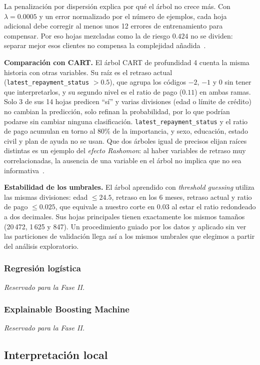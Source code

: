 \documentclass[a4paper,11pt]{article}
\begin{document}
La penalización por dispersión explica por qué el árbol no crece más. Con $\lambda=0.0005$ y un error normalizado por el número de ejemplos, cada hoja adicional debe corregir al menos unos 12 errores de entrenamiento para compensar. Por eso hojas mezcladas como la de riesgo $0.424$ no se dividen: separar mejor esos clientes no compensa la complejidad añadida~\cite{slidesLogical}.

\textbf{Comparación con CART.} El árbol CART de profundidad 4 cuenta la misma historia con otras variables. Su raíz es el retraso actual (\texttt{latest\_repayment\_status} $> 0.5$), que agrupa los códigos $-2$, $-1$ y $0$ sin tener que interpretarlos, y su segundo nivel es el ratio de pago ($0.11$) en ambas ramas. Solo 3 de sus 14 hojas predicen ``sí'' y varias divisiones (edad o límite de crédito) no cambian la predicción, solo refinan la probabilidad, por lo que podrían podarse sin cambiar ninguna clasificación. \texttt{latest\_repayment\_status} y el ratio de pago acumulan en torno al $80\%$ de la importancia, y sexo, educación, estado civil y plan de ayuda no se usan. Que dos árboles igual de precisos elijan raíces distintas es un ejemplo del \textit{efecto Rashomon}: al haber variables de retraso muy correlacionadas, la ausencia de una variable en el árbol no implica que no sea informativa~\cite{slidesLogical}.

\textbf{Estabilidad de los umbrales.} El árbol aprendido con \textit{threshold guessing} utiliza las mismas divisiones: edad $\leq 24.5$, retraso en los 6 meses, retraso actual y ratio de pago $\leq 0.025$, que equivale a nuestro corte en $0.03$ al estar el ratio redondeado a dos decimales. Sus hojas principales tienen exactamente los mismos tamaños (20\,472, 1\,625 y 847). Un procedimiento guiado por los datos y aplicado sin ver las particiones de validación llega así a los mismos umbrales que elegimos a partir del análisis exploratorio.

\subsubsection{Regresión logística}
\textit{Reservado para la Fase II.}

\subsubsection{Explainable Boosting Machine}
\textit{Reservado para la Fase II.}

\subsection{Interpretación local}
\end{document}
